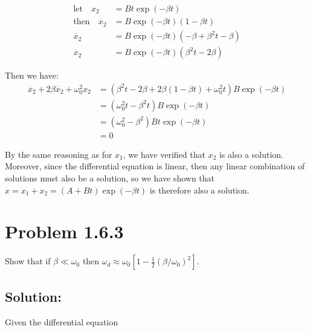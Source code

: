 \documentclass{article}
\begin{document}
\[
  \begin{split}
    \text{let}\quad x_2 &= B t \exp(-\beta t)
    \\
    \text{then}\quad\dot{x_2} &=  B \exp(-\beta t) ( 1 - \beta t )
    \\
    \ddot{x_2} &=  B \exp(-\beta t) ( -\beta + \beta^2 t - \beta )
    \\
    \ddot{x_2} &=  B \exp(-\beta t) ( \beta^2 t - 2\beta )
  \end{split}
\]

Then we have:
\[
  \begin{split}
    \ddot{x_2} + 2 \beta \dot{x_2} + \omega_{0}^2 x_2 &= ( \beta^2 t -2 \beta +2 \beta( 1 - \beta t )
                                                            +\omega_{0}^2 t ) B \exp( -\beta t )
                                                      \\
                                                      &= ( \omega_{0}^2 t -\beta^2 t ) B \exp( -\beta t )
                                                      \\
                                                      &= ( \omega_{0}^2 - \beta ^2 ) B t \exp( -\beta t )
                                                      \\
                                                      &= 0
  \end{split}
\]

By the same reasoning as for $x_1$, we have verified that $x_2$ is also a solution. Moreover, since the
differential equation is linear, then any linear combination of solutions must also be a solution, so
we have shown that $x = x_1 + x_2 = (A +Bt)\exp(-\beta t)$ is therefore also a solution.

\newpage

%
%

\section*{Problem 1.6.3}

Show that if $\beta \ll \omega_{0}$ then $ \omega_d \approx \omega_{0}[ 1 - \frac{1}{2} (\beta / \omega_0)^2 ]. $

\subsection*{Solution:}

Given the differential equation
\end{document}
